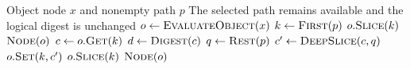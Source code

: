 \begin{algorithm}[htbp]
\caption{Deep Slice Along Object Path}
\label{alg:deep-slice}
\begin{algorithmic}[1]
\Require Object node $x$ and nonempty path $p$
\Ensure The selected path remains available and the logical digest is unchanged
  \State $o \gets \Call{EvaluateObject}{x}$
  \State $k \gets \Call{First}{p}$
    \State $o.\Call{Slice}{k}$
    \State \Return $\Call{Node}{o}$
  \EndIf
  \State $c \gets o.\Call{Get}{k}$
  \State $d \gets \Call{Digest}{c}$
  \State $q \gets \Call{Rest}{p}$
  \State $c' \gets \Call{DeepSlice}{c,q}$
    \State {}
  \EndIf
  \State $o.\Call{Set}{k,c'}$
  \State $o.\Call{Slice}{k}$ 
  \State \Return $\Call{Node}{o}$
\EndFunction
\end{algorithmic}
\end{algorithm}
